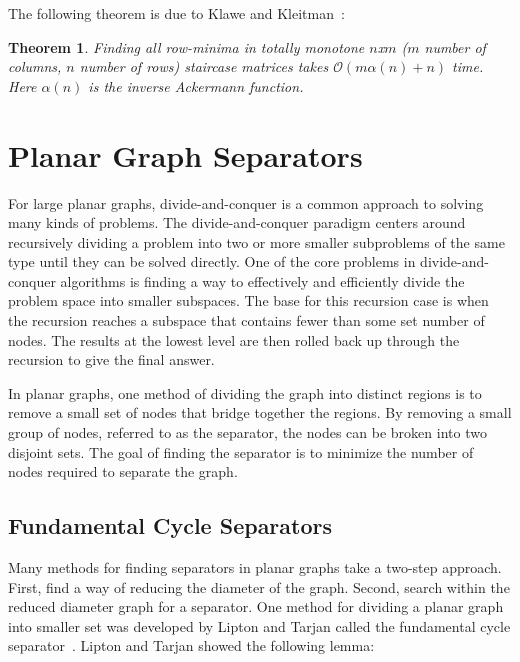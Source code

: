 \documentclass[11pt]{article}
\newtheorem{theorem}{Theorem}[section]
\begin{document}
 The following theorem is due to Klawe and Kleitman~\cite{klawe1990almost}:\\

\begin{theorem}
Finding all row-minima in totally monotone $n$x$m$ ($m$ number of columns, $n$ number of rows) staircase matrices takes $\mathcal{O}(m\alpha(n)+n)$ time. Here $\alpha(n)$ is the inverse Ackermann function.
\end{theorem}

\section{Planar Graph Separators}
\label{sec:graph-sep}


For large planar graphs, divide-and-conquer is a common approach to solving many kinds of problems. The divide-and-conquer paradigm centers around recursively dividing a problem into two or more smaller subproblems of the same type until they can be solved directly. One of the core problems in divide-and-conquer algorithms is finding a way to effectively and efficiently divide the problem space into smaller subspaces. The base for this recursion case is when the recursion reaches a subspace that contains fewer than some set number of nodes. The results at the lowest level are then rolled back up through the recursion to give the final answer.

In planar graphs, one method of dividing the graph into distinct regions is to remove a small set of nodes that bridge together the regions. By removing a small group of nodes, referred to as the separator, the nodes can be broken into two disjoint sets. The goal of finding the separator is to minimize the number of nodes required to separate the graph.

\subsection{Fundamental Cycle Separators}
\label{sec:graph-sep-fund-cycle-sep}

Many methods for finding separators in planar graphs take a two-step approach. First, find a way of reducing the diameter of the graph. Second, search within the reduced diameter graph for a separator. One method for dividing a planar graph into smaller set was developed by Lipton and Tarjan called the fundamental cycle separator~\cite{lipton1979separator}. Lipton and Tarjan showed the following lemma: \\
\end{document}
